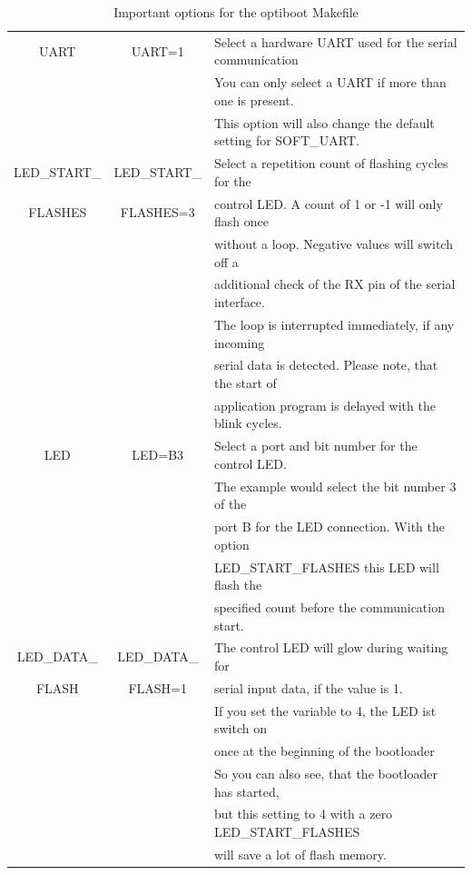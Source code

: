 \begin{table}[H]
\begin{center}
\begin{tabular}{| c | c | l |}
    \hline
    UART           & UART=1         & Select a hardware UART used for the serial communication \\
                   &                & You can only select a UART if more than one is present. \\
		   &		    & This option will also change the default setting for SOFT\_UART.\\
    \hline
 LED\_START\_      & LED\_START\_   & Select a repetition count of flashing cycles for the \\
   FLASHES         &   FLASHES=3    & control LED. A count of 1 or -1 will only flash once \\
                   &                & without a loop. Negative values will switch off a \\
                   &                & additional check of the RX pin of the serial interface. \\
                   &                & The loop is interrupted immediately, if any incoming \\
                   &                & serial data is detected. Please note, that the start of \\
                   &                & application program is delayed with the blink cycles. \\

    \hline
 LED               & LED=B3         & Select a port and bit number for the control LED. \\
                   &                & The example would select the bit number 3 of the \\
                   &                & port B for the LED connection. With the option \\
                   &                & LED\_START\_FLASHES  this LED will flash the \\
                   &                & specified count before the communication start. \\
    \hline
 LED\_DATA\_       & LED\_DATA\_    & The control LED will glow during waiting for \\
      FLASH        &    FLASH=1     & serial input data, if the value is 1. \\
	           &                & If you set the variable to 4, the LED ist switch on \\
		   &                & once at the beginning of the bootloader \\
		   &                & So you can also see, that the bootloader has started, \\
		   &                & but this setting to 4 with a zero LED\_START\_FLASHES \\
		   &                & will save a lot of flash memory. \\
    \hline
    \end{tabular}
  \end{center}
  \caption{Important options for the optiboot Makefile}
  \label{tab:options1}
\end{table}

